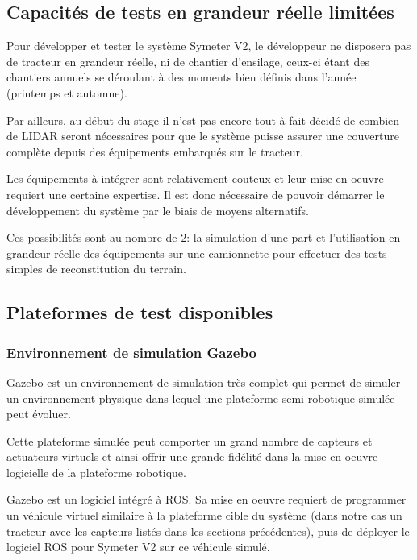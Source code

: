 \documentclass[12pt,a4paper]{report}
\begin{document}
		\subsection{Capacités de tests en grandeur réelle limitées}
		Pour développer et tester le système Symeter V2, le développeur ne disposera pas de tracteur en grandeur réelle, ni de chantier d'ensilage, ceux-ci étant des chantiers annuels se déroulant à des moments bien définis dans l'année (printemps et automne).
		
		\para Par ailleurs, au début du stage il n'est pas encore tout à fait décidé de combien de LIDAR seront nécessaires pour que le système puisse assurer une couverture complète depuis des équipements embarqués sur le tracteur.
		
		\para Les équipements à intégrer sont relativement couteux et leur mise en oeuvre requiert une certaine expertise. Il est donc nécessaire de pouvoir démarrer le développement du système par le biais de moyens alternatifs.
		
		\para Ces possibilités sont au nombre de 2: la simulation d'une part et l'utilisation en grandeur réelle des équipements sur une camionnette pour effectuer des tests simples de reconstitution du terrain.
		
		\subsection{Plateformes de test disponibles}
			
			\subsubsection{Environnement de simulation Gazebo}
			
			Gazebo est un environnement de simulation très complet qui permet de simuler un environnement physique dans lequel une plateforme semi-robotique simulée peut évoluer. 
			
			\para Cette plateforme simulée peut comporter un grand nombre de capteurs et actuateurs virtuels et ainsi offrir une grande fidélité dans la mise en oeuvre logicielle de la plateforme robotique.
			
			\para Gazebo est un logiciel intégré à ROS. Sa mise en oeuvre requiert de programmer un véhicule virtuel similaire à la plateforme cible du système (dans notre cas un tracteur avec les capteurs listés dans les sections précédentes), puis de déployer le logiciel ROS pour Symeter V2 sur ce véhicule simulé. 
			
\end{document}
